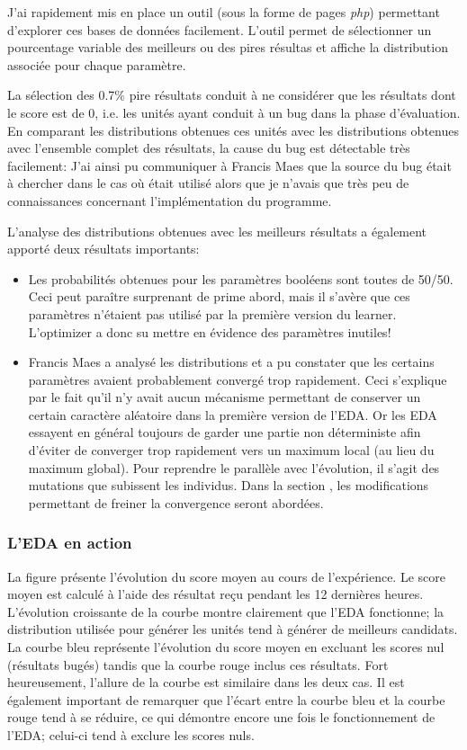 \documentclass[a4paper, 11pt]{report}
\begin{document}
J'ai rapidement mis en place un outil (sous la forme de pages \textit{php}) permettant d'explorer ces bases de données facilement. %
L'outil permet de sélectionner un pourcentage variable des meilleurs ou des pires résultas et affiche la distribution associée pour chaque paramètre.

La sélection des 0.7\% pire résultats conduit à ne considérer que les résultats dont le score est de 0, i.e. les unités ayant conduit à un bug dans la phase d'évaluation. En comparant les distributions obtenues ces unités avec les distributions obtenues avec l'ensemble complet des résultats, la cause du bug est détectable très facilement:
J'ai ainsi pu communiquer à Francis Maes que la source du bug était à chercher dans le cas où %
était utilisé alors que je n'avais que très peu de connaissances concernant l'implémentation du programme.

L'analyse des distributions obtenues avec les meilleurs résultats a également apporté deux résultats importants:
\begin{itemize}
\item Les probabilités obtenues pour les paramètres booléens sont toutes de 50/50. Ceci peut paraître surprenant de prime abord, mais il s'avère que ces paramètres n'étaient pas utilisé par la première version du learner. L'optimizer a donc su mettre en évidence des paramètres inutiles!
\item Francis Maes a analysé les distributions et a pu constater que les certains paramètres avaient probablement convergé trop rapidement. Ceci s'explique par le fait qu'il n'y avait aucun mécanisme permettant de conserver un certain caractère aléatoire dans la première version de l'EDA. Or les EDA essayent en général toujours de garder une partie non déterministe afin d'éviter de converger trop rapidement vers un maximum local (au lieu du maximum global). Pour reprendre le parallèle avec l'évolution, il s'agit des mutations que subissent les individus. Dans la section %
, les modifications permettant de freiner la convergence seront abordées.
\end{itemize}


\subsubsection{L'EDA en action}
La figure %
présente l'évolution du score moyen au cours de l'expérience. Le score moyen est calculé à l'aide des résultat reçu pendant les 12 dernières heures. L'évolution croissante de la courbe montre clairement que l'EDA fonctionne; la distribution utilisée pour générer les unités tend à générer de meilleurs candidats. La courbe bleu représente l'évolution du score moyen en excluant les scores nul (résultats bugés) tandis que la courbe rouge inclus ces résultats. Fort heureusement, l'allure de la courbe est similaire dans les deux cas. Il est également important de remarquer que l'écart entre la courbe bleu et la courbe rouge tend à se réduire, ce qui démontre encore une fois le fonctionnement de l'EDA; celui-ci tend à exclure les scores nuls.
\end{document}
